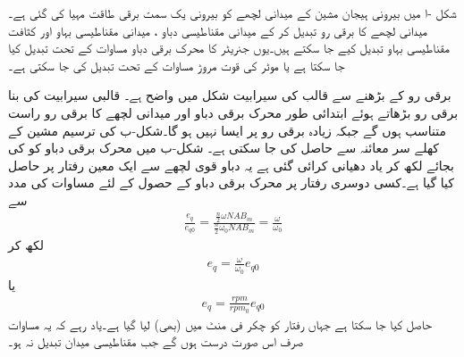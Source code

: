 شکل -ا میں بیرونی ہیجان مشین کے میدانی لچھے کو بیرونی یک سمت  برقی طاقت مہیا کی گئی ہے۔میدانی لچھے کا برقی رو تبدیل کر کے میدانی مقناطیسی دباو  ، میدانی مقناطیسی بہاو   اور کثافت مقناطیسی بہاو   تبدیل کیے جا سکتے ہیں۔یوں جنریٹر کا محرک برقی دباو مساوات   کے تحت تبدیل کیا جا سکتا ہے یا  موٹر کی قوت مروڑ مساوات   کے تحت تبدیل کی جا سکتی ہے۔

برقی رو کے بڑھنے سے قالب کی سیرابیت  شکل   میں واضح ہے۔ قالبی سیرابیت کی بنا برقی رو بڑھاتے ہوئے ابتدائی طور محرک برقی دباو اور میدانی لچھے کا برقی رو  راست متناسب ہوں گے جبکہ زیادہ برقی رو پر ایسا نہیں ہو گا۔شکل-ب کی ترسیم مشین کے کھلے سر معائنہ سے حاصل کی جا سکتی ہے۔ شکل-ب میں محرک برقی دباو کو  کی بجائے   لکھ کر  یاد دھیانی کرائی گئی ہے  یہ  دباو  قوی لچھے سے  ایک معین رفتار  پر حاصل کیا گیا ہے۔کسی دوسری رفتار  پر محرک برقی دباو  کے حصول کے لئے   مساوات  کی مدد  سے 
\begin{align}\label{مساوات_یکسمتی_اندرونی_دباو_بالمقابل_رفتار}
\frac{e_q}{e_{q0}}=\frac{\frac{n}{2} \omega N A B_m}{\frac{n}{2} \omega_0 N A B_m}=\frac{\omega}{\omega_0}
\end{align}
لکھ کر
\begin{align}
e_q=\frac{\omega}{\omega_0}e_{q0}
\end{align}
 یا
\begin{align}\label{مساوات_یکسمتی_چکر_بالمقابل_رفتار}
e_q=\frac{rpm}{rpm_0} e_{q0}
\end{align}
حاصل کیا جا سکتا ہے جہاں رفتار کو چکر فی منٹ میں (بھی) لیا گیا ہے۔یاد رہے کہ یہ مساوات صرف اس صورت  درست ہوں گے جب مقناطیسی میدان تبدیل نہ ہو۔

